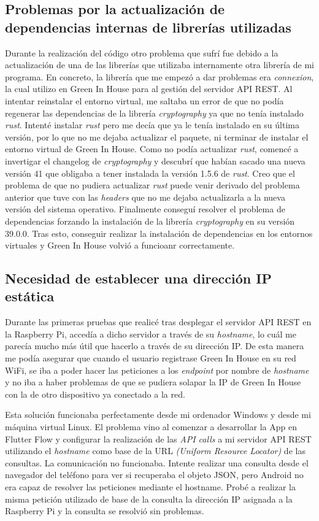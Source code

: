     \subsection{Problemas por la actualización de dependencias internas de  librerías utilizadas}
    Durante la realización del código otro problema que sufrí fue debido a la actualización de una de las librerías que utilizaba internamente otra librería de mi programa. En concreto, la librería que me empezó a dar problemas era \textit{connexion}, la cual utilizo en Green In House para al gestión del servidor API REST. Al intentar reinstalar el entorno virtual, me saltaba un error de que no podía regenerar las dependencias de la librería \textit{cryptography} ya que no tenía instalado \textit{rust}. Intenté instalar \textit{rust} pero me decía que ya le tenía instalado en su última versión, por lo que no me dejaba actualizar el paquete, ni terminar de instalar el entorno virtual de Green In House. Como no podía actualizar \textit{rust}, comencé a invertigar el changelog de \textit{cryptography} y descubrí que habían sacado una nueva versión 41 que obligaba a tener instalada la versión 1.5.6 de \textit{rust}. Creo que el problema de que no pudiera actualizar \textit{rust} puede venir derivado del problema anterior que tuve con las \textit{headers} que no me dejaba actualizarla a la nueva versión del sistema operativo. Finalmente conseguí resolver el problema de dependencias forzando la instalación de la librería \textit{cryptography} en su versión 39.0.0. Tras esto, conseguir realizar la instalación de dependencias en los entornos virtuales y Green In House volvió a funcioanr correctamente.    
    
    \subsection{Necesidad de establecer una dirección IP estática}
    Durante las primeras pruebas que realicé tras desplegar el servidor API REST en la Raspberry Pi, accedía a dicho servidor a través de su \textit{hostname}, lo cuál me parecía mucho más útil que hacerlo a través de su dirección IP. De esta manera me podía asegurar que cuando el usuario registrase Green In House en su red WiFi, se iba a poder hacer las peticiones a los \textit{endpoint} por nombre de \textit{hostname} y no iba a haber problemas de que se pudiera solapar la IP de Green In House con la de otro dispositivo ya conectado a la red. 
    
    Esta solución funcionaba perfectamente desde mi ordenador Windows y desde mi máquina virtual Linux. El problema vino al comenzar a desarrollar la App en Flutter Flow y configurar la realización de las \textit{API calls} a mi servidor API REST utilizando el \textit{hostname} como base de la URL \textit{(Uniform Resource Locator)} de las consultas. La comunicación no funcionaba. Intente realizar una consulta desde el navegador del teléfono para ver si recuperaba el objeto JSON, pero Android no era capaz de resolver las peticiones mediante el hostname. Probé a realizar la misma petición utilizado de base de la consulta la dirección IP asignada a la Raspberry Pi y la consulta se resolvió sin problemas. 
    
